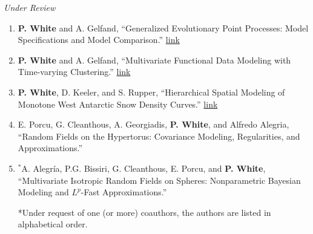 \documentclass[12pt]{article}
\begin{document}
\emph{Under Review}

\begin{enumerate}[label=$\bullet$]
\item \textbf{P. White} and A. Gelfand, ``Generalized Evolutionary Point Processes: Model Specifications and Model Comparison.'' 
\href{https://arxiv.org/abs/1910.06897}{link}
\item \textbf{P. White} and A. Gelfand, ``Multivariate Functional Data Modeling with Time-varying Clustering.'' \href{https://arxiv.org/abs/1904.11518}{link}
\item \textbf{P. White}, D. Keeler, and S. Rupper, ``Hierarchical Spatial Modeling of Monotone West Antarctic Snow Density Curves.'' \href{https://arxiv.org/abs/2001.05520}{link}
\item E. Porcu, G. Cleanthous, A. Georgiadis, \textbf{P. White}, and  Alfredo Alegria, ``Random Fields on the Hypertorus: Covariance Modeling, Regularities, and Approximations.'' 
\item $^*$A. Alegr\'ia, P.G. Bissiri, G. Cleanthous, E. Porcu, and \textbf{P. White}, ``Multivariate Isotropic Random  Fields on Spheres: Nonparametric Bayesian Modeling and $L^p$-Fast Approximations.''

*Under request of one (or more) coauthors, the authors are listed in alphabetical order.
\end{enumerate}


%
\end{document}
